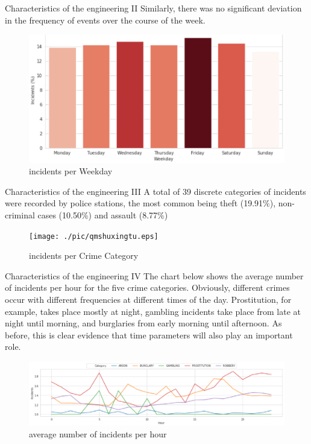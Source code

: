 \documentclass[
 size=14pt,
 paper=smartboard,  %
 mode=present, 		%
 display=slides, 	%
 style=tuliplab,  	%
 pauseslide,
 fleqn,leqno]{powerdot}
\begin{document}
\begin{slide}[toc=,bm=]{Characteristics of the engineering II}
Similarly, there was no significant deviation in the frequency of events over the course of the week.
	\begin{center}
		\begin{figure}[htbp]
			\includegraphics[scale=0.8]{./pic/qmzhifangtu.eps}
			\caption{incidents per Weekday}
		\end{figure}
	\end{center}
	
\end{slide}

\begin{slide}[toc=,bm=]{Characteristics of the engineering III}
A total of 39 discrete categories of incidents were recorded by police stations, the most common being theft (19.91\%), non-criminal cases (10.50\%) and assault (8.77\%)

		\begin{figure}[htbp]
			\texttt{[image: ./pic/qmshuxingtu.eps]}
			\caption{incidents per Crime Category}
		\end{figure}
	
\end{slide}

\begin{slide}[toc=,bm=]{Characteristics of the engineering IV}
The chart below shows the average number of incidents per hour for the five crime categories.
Obviously, different crimes occur with different frequencies at different times of the day.
Prostitution, for example, takes place mostly at night, gambling incidents take place from late at night until morning, and burglaries from early morning until afternoon.
As before, this is clear evidence that time parameters will also play an important role.
	
	\begin{figure}[htbp]
		\includegraphics[scale=0.9]{./pic/qmzhexiantu.eps}
		\caption{average number of incidents per hour}
	\end{figure}
	
\end{slide}
\end{document}
